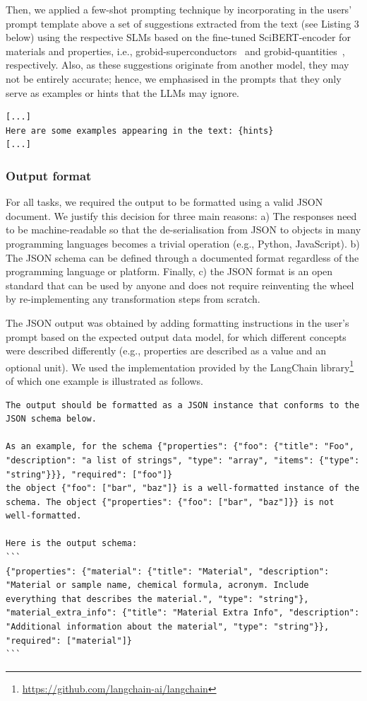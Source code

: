 Then, we applied a few-shot prompting technique by incorporating in the users' prompt template above a set of suggestions extracted from the text (see Listing 3 below) using the respective SLMs based on the fine-tuned SciBERT-encoder for materials and properties, i.e., grobid-superconductors~\cite{lfoppiano2023automatic} and grobid-quantities~\cite{foppiano2019quantities}, respectively. Also, as these suggestions originate from another model, they may not be entirely accurate; hence, we emphasised in the prompts that they only serve as examples or hints that the LLMs may ignore.  

\begin{lstlisting}[caption=Few-shot prompting modified prompt template.]
[...]
Here are some examples appearing in the text: {hints}
[...]
\end{lstlisting}

\subsubsection{Output format}
\label{subsubsec:output-format}

For all tasks, we required the output to be formatted using a valid JSON document. 
We justify this decision for three main reasons: 
a) The responses need to be machine-readable so that the de-serialisation from JSON to objects in many programming languages becomes a trivial operation (e.g., Python, JavaScript).
b) The JSON schema can be defined through a documented format regardless of the programming language or platform. 
Finally, c) the JSON format is an open standard that can be used by anyone and does not require reinventing the wheel by re-implementing any transformation steps from scratch.

The JSON output was obtained by adding formatting instructions in the user's prompt based on the expected output data model, for which different concepts were described differently (e.g., properties are described as a value and an optional unit).
We used the implementation provided by the LangChain library\footnote{\url{https://github.com/langchain-ai/langchain}} of which one example is illustrated as follows. 

\begin{lstlisting}[caption=Example of formatting instruction to a valid JSON format]
The output should be formatted as a JSON instance that conforms to the JSON schema below.

As an example, for the schema {"properties": {"foo": {"title": "Foo", "description": "a list of strings", "type": "array", "items": {"type": "string"}}}, "required": ["foo"]}
the object {"foo": ["bar", "baz"]} is a well-formatted instance of the schema. The object {"properties": {"foo": ["bar", "baz"]}} is not well-formatted.

Here is the output schema:
```
{"properties": {"material": {"title": "Material", "description": "Material or sample name, chemical formula, acronym. Include everything that describes the material.", "type": "string"}, "material_extra_info": {"title": "Material Extra Info", "description": "Additional information about the material", "type": "string"}}, "required": ["material"]}
```
\end{lstlisting}


